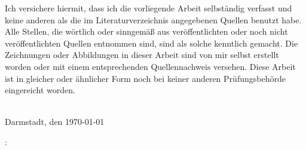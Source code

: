 

\begin{declaration}
	
	
	 \noindent Ich versichere hiermit, dass ich die vorliegende Arbeit selbständig verfasst und keine anderen als die im Literaturverzeichnis angegebenen Quellen benutzt habe.
	 Alle Stellen, die wörtlich oder sinngemäß aus veröffentlichten oder noch nicht veröffentlichten Quellen entnommen sind, sind als solche kenntlich gemacht.
	 Die Zeichnungen oder Abbildungen in dieser Arbeit sind von mir selbst erstellt worden oder mit einem entsprechenden Quellennachweis versehen.
	 Diese Arbeit ist in gleicher oder ähnlicher Form noch bei keiner anderen Prüfungsbehörde eingereicht worden.
	
	\hfill\\

	\noindent Darmstadt, den \today\\
	\noindent
	
	\begin{minipage}[t]{.35\textwidth}
		\hfill
	\end{minipage}
	\authorname: \dotfill\strut

\end{declaration}

